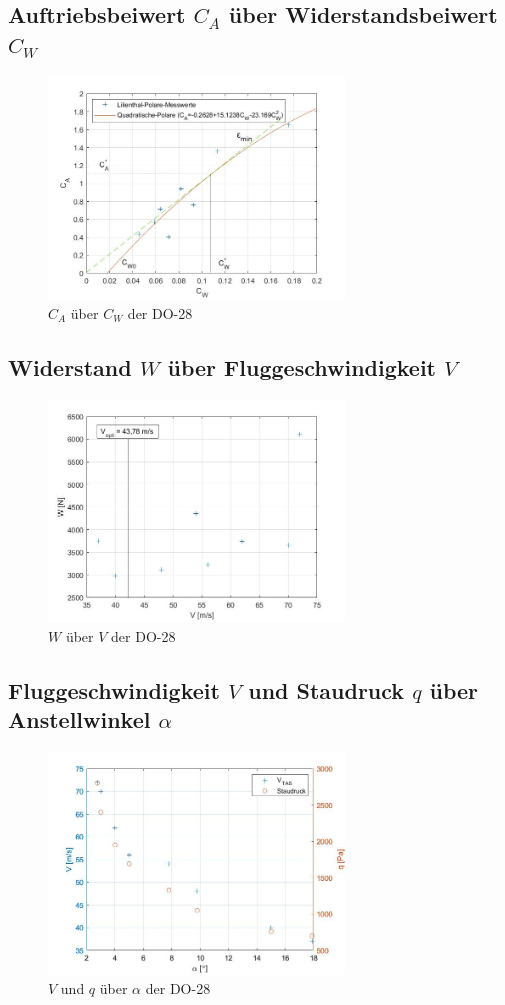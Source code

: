 \subsection{Auftriebsbeiwert $C_{A}$ über Widerstandsbeiwert $C_{W}$}

\begin{figure}[H]
	\centering	\includegraphics[width=0.7\textwidth]{./Bilder/CA_CW_DO28.jpg}
	\caption{$C_{A}$ über $C_{W}$ der DO-28}
	\label{fig:CA_CW_DO28}
\end{figure}

\subsection{Widerstand $W$ über Fluggeschwindigkeit $V$}

\begin{figure}[H]
	\centering	\includegraphics[width=0.7\textwidth]{./Bilder/W_V_DO28.jpg}
	\caption{$W$ über $V$ der DO-28}
	\label{fig:W_V_DO28}
\end{figure}


\subsection{Fluggeschwindigkeit $V$ und Staudruck $q$ über Anstellwinkel $\alpha$}

\begin{figure}[H]
	\centering	\includegraphics[width=0.7\textwidth]{./Bilder/V_q_alpha.jpg}
	\caption{$V$ und $q$ über $\alpha$ der DO-28}
	\label{fig:V_q_alpha_DO28}
\end{figure}